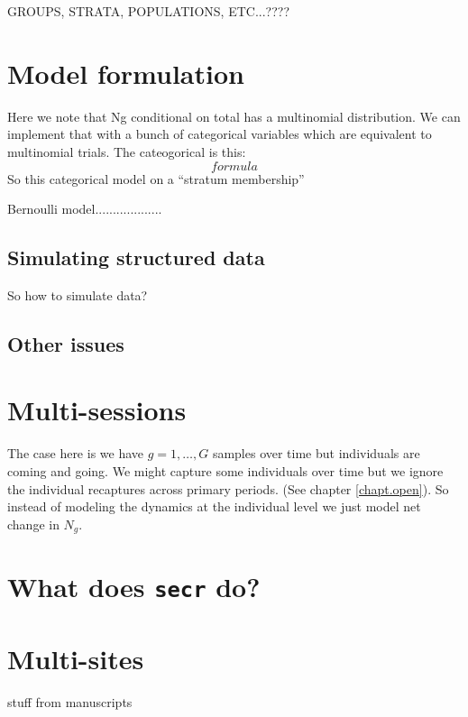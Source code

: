 GROUPS, STRATA, POPULATIONS, ETC...????

\section{Model formulation}

Here we note that Ng conditional on total has a multinomial
distribution. We can implement that with a bunch of categorical
variables which are equivalent to multinomial trials.  The
cateogorical is this:
\[
formula
\]
So this categorical model on a ``stratum membership''

Bernoulli model...................

\subsection{Simulating structured data}

So how to simulate data?


\subsection{Other issues}


\section{Multi-sessions}

The case here is we have $g=1,\ldots,G$ samples over time but
individuals are coming and going.
We might capture some individuals over time but we ignore the
individual recaptures across primary periods. (See chapter
\ref{chapt.open}). So instead of modeling the dynamics at the individual
level we just model net change in $N_{g}$.


\section{What does \mbox{\tt secr} do?}



\section{Multi-sites}


stuff from manuscripts





